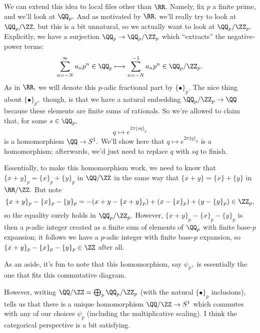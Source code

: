 We can extend this idea to local files other than $\RR.$ Namely, fix $p$ a finite prime, and we'll look at $\QQ_p.$ And as motivated by $\RR,$ we'll really try to look at $\QQ_p/\ZZ,$ but this is a bit unnatural, so we actually want to look at $\QQ_p/\ZZ_p.$ Explicitly, we have a surjection $\QQ_p\to\QQ_p/\ZZ_p$ which ``extracts'' the negative-power terms:
\[\sum_{n=-N}^\infty a_np^n\in\QQ_p\longmapsto\sum_{n=-N}^{-1}a_np^n\in\QQ_p/\ZZ_p.\]
As in $\RR,$ we will denote this $p$-adic fractional part by $\{\bullet\}_p.$ The nice thing about $\{\bullet\}_p,$ though, is that we have a natural embedding $\QQ_p/\ZZ_p\to\QQ$ because these elements are finite sums of rationals. So we're allowed to claim that, for some $s\in\QQ_p,$
\[q\mapsto e^{2\pi\{sq\}_p}\]
is a homomorphism $\QQ\to S^1.$ We'll show here that $q\mapsto e^{2\pi\{q\}_p}$ is a homomorphism; afterwards, we'd just need to replace $q$ with $sq$ to finish.

Essentially, to make this homomorphism work, we need to know that $\{x+y\}_p=\{x\}_p+\{y\}_p$ in $\QQ/\ZZ$ in the same way that $\{x+y\}=\{x\}+\{y\}$ in $\RR/\ZZ.$ But note
\[\{x+y\}_p-\{x\}_p-\{y\}_p=-(x+y-\{x+y\}_p)+(x-\{x\}_p)+(y-\{y\}_p)\in\ZZ_p,\]
so the equality surely holds in $\QQ_p/\ZZ_p.$ However, $\{x+y\}_p-\{x\}_p-\{y\}_p$ is then a $p$-adic integer created as a finite sum of elements of $\QQ_p$ with finite base-$p$ expansion; it follows we have a $p$-adic integer with finite base-$p$ expansion, so $\{x+y\}_p-\{x\}_p-\{y\}_p\in\ZZ$ after all.

As an aside, it's fun to note that this homomorphism, say $\psi_p,$ is essentially the one that fits this commutative diagram.
\begin{center}
\end{center}
However, writing $\QQ/\ZZ=\bigoplus_p\QQ_p/\ZZ_p$ (with the natural $\{\bullet\}_p$ inclusions), tells us that there is a unique homomorphism $\QQ/\ZZ\to S^1$ which commutes with any of our choices $\psi_p$ (including the multiplicative scaling). I think the categorical perspective is a bit satisfying.

